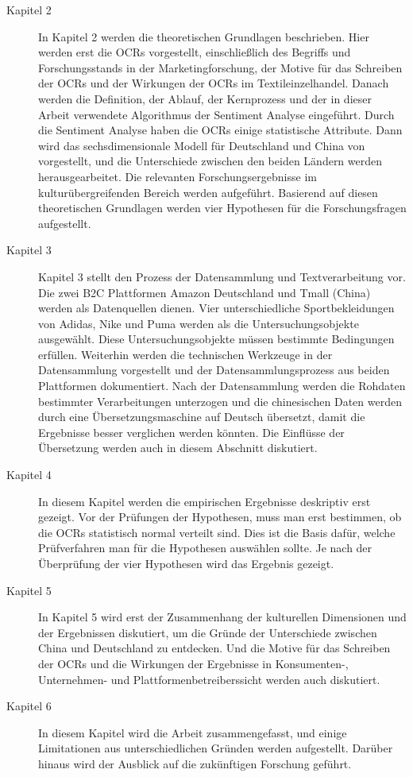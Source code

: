 \begin{description}
	\item[Kapitel 2] In Kapitel 2 werden die theoretischen Grundlagen beschrieben. Hier werden erst die \acl{OCRs} vorgestellt, einschließlich des Begriffs und Forschungsstands in der Marketingforschung, der Motive für das Schreiben der \acl{OCRs} und der Wirkungen der \acl{OCRs} im Textileinzelhandel. Danach werden die Definition, der Ablauf, der Kernprozess und der in dieser Arbeit verwendete Algorithmus der Sentiment Analyse eingeführt. Durch die Sentiment Analyse haben die \acl{OCRs} einige statistische Attribute. Dann wird das sechsdimensionale Modell für Deutschland und China von \citeauthor{hofstede2013interkulturelle} vorgestellt, und die Unterschiede zwischen den beiden Ländern werden herausgearbeitet. Die relevanten Forschungsergebnisse im kulturübergreifenden Bereich werden aufgeführt. Basierend auf diesen theoretischen Grundlagen werden vier Hypothesen für die Forschungsfragen aufgestellt. 
	\item[Kapitel 3] Kapitel 3 stellt den Prozess der Datensammlung und Textverarbeitung vor. Die zwei \ac{B2C} Plattformen Amazon Deutschland und Tmall (China) werden als Datenquellen dienen. Vier unterschiedliche Sportbekleidungen von Adidas, Nike und Puma werden als die Untersuchungsobjekte ausgewählt. Diese Untersuchungsobjekte müssen bestimmte Bedingungen erfüllen. Weiterhin werden die technischen Werkzeuge in der Datensammlung vorgestellt und der Datensammlungsprozess aus beiden Plattformen dokumentiert. Nach der Datensammlung werden die Rohdaten bestimmter Verarbeitungen unterzogen und die chinesischen Daten werden durch eine Übersetzungsmaschine auf Deutsch übersetzt, damit die Ergebnisse besser verglichen werden könnten. Die Einflüsse der Übersetzung werden auch in diesem Abschnitt diskutiert.
	\item[Kapitel 4] In diesem Kapitel werden die empirischen Ergebnisse deskriptiv erst gezeigt. Vor der Prüfungen der Hypothesen, muss man erst bestimmen, ob die \acl{OCRs} statistisch normal verteilt sind. Dies ist die Basis dafür, welche Prüfverfahren man für die Hypothesen auswählen sollte. Je nach der Überprüfung der vier Hypothesen wird das Ergebnis gezeigt.
	\item[Kapitel 5] In Kapitel 5 wird erst der Zusammenhang der kulturellen Dimensionen und der Ergebnissen diskutiert, um die Gründe der Unterschiede zwischen China und Deutschland zu entdecken. Und die Motive für das Schreiben der \acl{OCRs} und die Wirkungen der Ergebnisse in Konsumenten-, Unternehmen- und Plattformenbetreiberssicht werden auch diskutiert.  
	\item[Kapitel 6] In diesem Kapitel wird die Arbeit zusammengefasst, und einige Limitationen aus unterschiedlichen Gründen werden aufgestellt. Darüber hinaus wird der Ausblick auf die zukünftigen Forschung geführt.
\end{description} 

